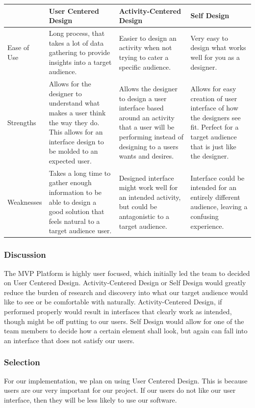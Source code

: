 \documentclass[onecolumn, draftclsnofoot,10pt, compsoc]{IEEEtran}
\begin{document}
{\tablehead{}
\begin{supertabular}{|p{2.5cm}|p{4.5cm}|p{4.5cm}|p{4.5cm}|}
\hline  
	& User Centered Design 
	& Activity-Centered Design 
	& Self Design\\ 
\hline
	Ease of Use
	& Long process, that takes a lot of data gathering to provide insights into a target audience.
	& Easier to design an activity when not trying to cater a specific audience. 
	& Very easy to design what works well for you as a designer. \\ 
\hline
	Strengths
	& Allows for the designer to understand what makes a user think the way they do. 
		This allows for an interface design to be molded to an expected user. 
	& Allows the designer to design a user interface based around an activity that 
		a user will be performing instead of designing to a users wants and desires. 
	& Allows for easy creation of user interface of how the designers see fit. 
		Perfect for a target audience that is just like the designer. \\ 
\hline
	Weaknesses
	& Takes a long time to gather enough information to be able to design a 
		good solution that feels natural to a target audience user.
	& Designed interface might work well for an intended activity, but could 
		be antagonistic to a target audience.
	& Interface could be intended for an entirely different audience, 
		leaving a confusing experience.\\ 
\hline

\end{supertabular}

\medskip

\subsubsection{Discussion}
\noindent The MVP Platform is highly user focused, which initially led the team to decided on User Centered Design. Activity-Centered Design or Self Design would greatly reduce the burden of research and discovery into what our target audience would like to see or be comfortable with naturally. Activity-Centered Design, if performed properly would result in interfaces that clearly work as intended, though might be off putting to our users. Self Design would allow for one of the team members to decide how a certain element shall look, but again can fall into an interface that does not satisfy our users.

\medskip
\subsubsection{Selection}
\noindent For our implementation, we plan on using User Centered Design. This is because users are our very important for our project. If our users do not like our user interface, then they will be less likely to use our software.








}
\end{document}
